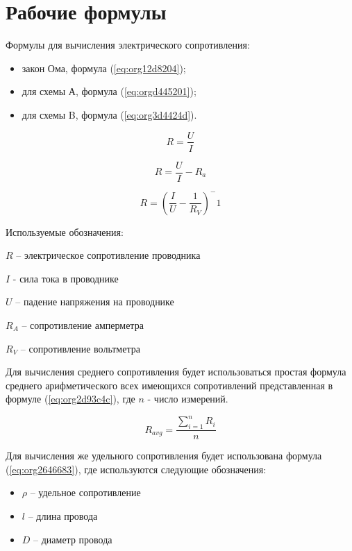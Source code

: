 \documentclass[14pt]{extarticle}
\begin{document}
\section{Рабочие формулы}
\label{sec:orgd148c89}

Формулы для вычисления электрического сопротивления:

\begin{itemize}
\item закон Ома, формула (\ref{eq:org12d8204});
\item для схемы А, формула (\ref{eq:orgd445201});
\item для схемы B, формула (\ref{eq:org3d4424d}).
\end{itemize}

\begin{equation}
\label{eq:org12d8204}
R = \frac{U}{I}
\end{equation}

\begin{equation}
\label{eq:orgd445201}
R = \frac{U}{I} - R_a
\end{equation}

\begin{equation}
\label{eq:org3d4424d}
R = (\frac{I}{U} - \frac{1}{R_V})^-1
\end{equation}

Используемые обозначения:

\(R\) -- электрическое сопротивление проводника

\(I\) - сила тока в проводнике

\(U\) -- падение напряжения на проводнике

\(R_A\) -- сопротивление амперметра 

\(R_V\) -- сопротивление вольтметра

Для вычисления среднего сопротивления будет использоваться простая
формула среднего арифметического всех имеющихся сопротивлений
представленная в формуле (\ref{eq:org2d93c4c}), где \(n\) - число измерений.


\begin{equation}
\label{eq:org2d93c4c}
R_{avg} = \frac{\sum\limits_{i = 1}^{n} R_i}{n}
\end{equation}

Для вычисления же удельного сопротивления будет использована формула (\ref{eq:org2646683}),
где используются следующие обозначения:

\begin{itemize}
\item \(\rho\) -- удельное сопротивление
\item \(l\) -- длина провода
\item \(D\) -- диаметр провода
\end{itemize}
\end{document}
